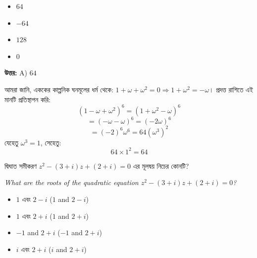 \documentclass[12pt, a4paper]{article}
\begin{document}
\begin{itemize}[label={}, leftmargin=1cm, itemsep=0.5em]
    \item[\textbf{A)}] $64$
    \item[\textbf{B)}] $-64$
    \item[\textbf{C)}] $128$
    \item[\textbf{D)}] $0$
\end{itemize}

\vspace{0.5em}
\begin{tcolorbox}[answerbox]
    \textbf{\color{success} উত্তর:} A) $64$
\end{tcolorbox}
\vspace{1em}

\begin{tcolorbox}[solutionbox={সমাধান (Solution)}]
    \noindent
    আমরা জানি, এককের কাল্পনিক ঘনমূলের ধর্ম থেকে: $1 + \omega + \omega^2 = 0 \Rightarrow 1 + \omega^2 = -\omega$। 
    প্রদত্ত রাশিতে এই মানটি প্রতিস্থাপন করি:
    \[ (1 - \omega + \omega^2)^6 = (1 + \omega^2 - \omega)^6 \]
    \[ = (-\omega - \omega)^6 = (-2\omega)^6 \]
    \[ = (-2)^6 \omega^6 = 64 (\omega^3)^2 \]
    যেহেতু $\omega^3 = 1$, সেহেতু:
    \[ 64 \times 1^2 = 64 \]
\end{tcolorbox}
\begin{tcolorbox}[questionbox={প্রশ্ন (Question) 24}]
    \noindent
    দ্বিঘাত সমীকরণ $z^2 - (3+i)z + (2+i) = 0$ এর মূলদ্বয় নিচের কোনটি?
    
    \vspace{0.8em}
    \begin{english}
    \noindent\textit{\color{darkgray}
    What are the roots of the quadratic equation $z^2 - (3+i)z + (2+i) = 0$?
    }
    \end{english}
\end{tcolorbox}

\begin{itemize}[label={}, leftmargin=1cm, itemsep=0.5em]
    \item[\textbf{A)}] $1$ এবং $2-i$ ($1$ and $2-i$)
    \item[\textbf{B)}] $1$ এবং $2+i$ ($1$ and $2+i$)
    \item[\textbf{C)}] $-1$ and $2+i$ ($-1$ and $2+i$)
    \item[\textbf{D)}] $i$ এবং $2+i$ ($i$ and $2+i$)
\end{itemize}
\end{document}
